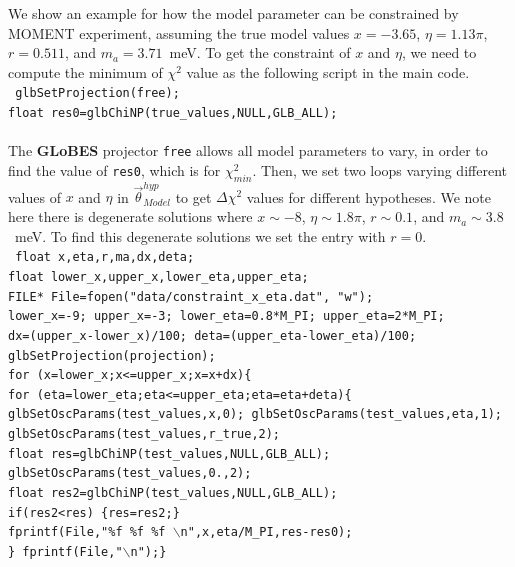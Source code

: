 \documentclass[aps,prd,nofootinbib,preprint]{revtex4}
\begin{document}
We show an example for how the model parameter can be constrained by MOMENT experiment, assuming the true model values $x=-3.65$, $\eta=1.13\pi$, $r=0.511$, and $m_a=3.71$~meV. To get the constraint of $x$ and $\eta$, we need to compute the minimum of $\chi^2$ value as the following script in the main code.\vspace{0.2cm}\\
\texttt{
    glbSetProjection(free);\\
    float res0=glbChiNP(true\_values,NULL,GLB\_ALL);\\ } \vspace{0.2cm}\\
%
The \textbf{GLoBES} projector \texttt{free} allows all model parameters to vary, in order to find the value of \texttt{res0}, which is for $\chi^2_{min}$.
Then, we set two loops varying different values of $x$ and $\eta$ in $\vec{\theta}^{hyp}_{Model}$ to get $\Delta \chi^2$ values for different hypotheses. We note here there is degenerate solutions where $x\sim-8$, $\eta\sim1.8\pi$, $r\sim 0.1$, and $m_a\sim3.8$~meV. To find this degenerate solutions we set the entry with $r=0$.\vspace{0.2cm}\\
%
\texttt{     float x,eta,r,ma,dx,deta;\\
     float lower\_x,upper\_x,lower\_eta,upper\_eta;\\
     FILE* File=fopen("data/constraint\_x\_eta.dat", "w");\\
    lower\_x=-9; upper\_x=-3; lower\_eta=0.8*M\_PI; upper\_eta=2*M\_PI;\\
    dx=(upper\_x-lower\_x)/100; deta=(upper\_eta-lower\_eta)/100;\\
        glbSetProjection(projection);\\
   for (x=lower\_x;x<=upper\_x;x=x+dx)\{ \\
    for (eta=lower\_eta;eta<=upper\_eta;eta=eta+deta)\{\\
     glbSetOscParams(test\_values,x,0); glbSetOscParams(test\_values,eta,1);\\
                glbSetOscParams(test\_values,r\_true,2);\\
        float res=glbChiNP(test\_values,NULL,GLB\_ALL);\\
        glbSetOscParams(test\_values,0.,2);\\
        float res2=glbChiNP(test\_values,NULL,GLB\_ALL);\\
        if(res2<res) \{res=res2;\}\\
            fprintf(File,"\%f \%f  \%f $\backslash$n",x,eta/M\_PI,res-res0);\\
                     \} fprintf(File,"$\backslash$n");\}\\
}
\end{document}
